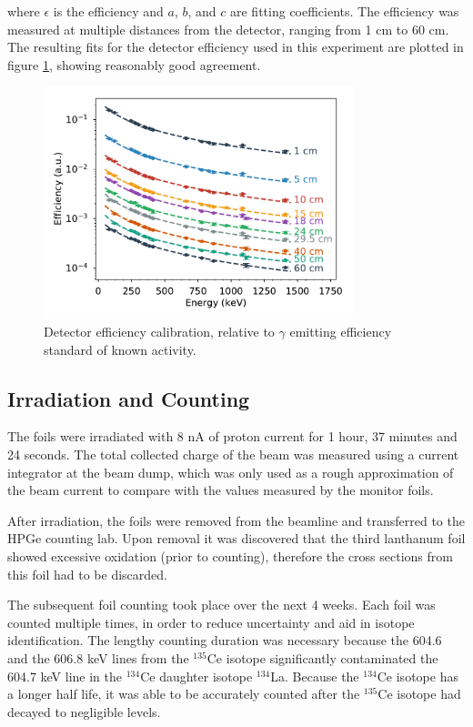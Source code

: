 \documentclass[aps,twocolumn,secnumarabic,balancelastpage,amsmath,amssymb,nofootinbib,floatfix]{revtex4-1}
\begin{document}
where $\epsilon$ is the efficiency and $a$, $b$, and $c$ are fitting coefficients.  The efficiency was measured at multiple distances from the detector, ranging from 1 cm to 60 cm.  The resulting fits for the detector efficiency used in this experiment are plotted in figure \ref{fig:efficiency_calibration}, showing reasonably good agreement.

\begin{figure}[htb]
\includegraphics[width=9cm]{calibration/efficiency_calibration.pdf}
\caption{Detector efficiency calibration, relative to $\gamma$ emitting efficiency standard of known activity.
}
\label{fig:efficiency_calibration}
\end{figure}

\subsection{Irradiation and Counting}
The foils were irradiated with 8 nA of proton current for 1 hour, 37 minutes and 24 seconds.  The total collected charge of the beam was measured using a current integrator at the beam dump, which was only used as a rough approximation of the beam current to compare with the values measured by the monitor foils.

After irradiation, the foils were removed from the beamline and transferred to the HPGe counting lab.  Upon removal it was discovered that the third lanthanum foil showed excessive oxidation (prior to counting), therefore the cross sections from this foil had to be discarded.

The subsequent foil counting took place over the next 4 weeks.  Each foil was counted multiple times, in order to reduce uncertainty and aid in isotope identification.  The lengthy counting duration was necessary because the 604.6 and the 606.8 keV lines from the $^{135}$Ce isotope significantly contaminated the 604.7 keV line in the $^{134}$Ce daughter isotope $^{134}$La. Because the $^{134}$Ce isotope has a longer half life, it was able to be accurately counted after the $^{135}$Ce isotope had decayed to negligible levels.
\end{document}
